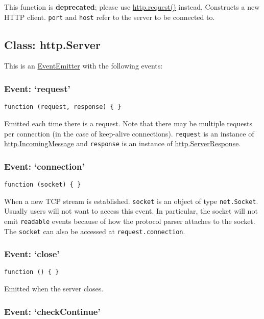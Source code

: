 This function is \textbf{deprecated}; please use
\hyperref[httpux5fhttpux5frequestux5foptionsux5fcallback]{http.request()}
instead. Constructs a new HTTP client. \texttt{port} and \texttt{host}
refer to the server to be connected to.

\subsection{Class: http.Server}\label{class-http.server}

This is an
\href{events.html\#events_class_events_eventemitter}{EventEmitter} with
the following events:

\subsubsection{Event: `request'}\label{event-request}

\texttt{function (request, response) \{ \}}

Emitted each time there is a request. Note that there may be multiple
requests per connection (in the case of keep-alive connections).
\texttt{request} is an instance of
\hyperref[httpux5fhttpux5fincomingmessage]{http.IncomingMessage} and
\texttt{response} is an instance of
\hyperref[httpux5fclassux5fhttpux5fserverresponse]{http.ServerResponse}.

\subsubsection{Event: `connection'}\label{event-connection}

\texttt{function (socket) \{ \}}

When a new TCP stream is established. \texttt{socket} is an object of
type \texttt{net.Socket}. Usually users will not want to access this
event. In particular, the socket will not emit \texttt{readable} events
because of how the protocol parser attaches to the socket. The
\texttt{socket} can also be accessed at \texttt{request.connection}.

\subsubsection{Event: `close'}\label{event-close}

\texttt{function () \{ \}}

Emitted when the server closes.

\subsubsection{Event: `checkContinue'}\label{event-checkcontinue}

